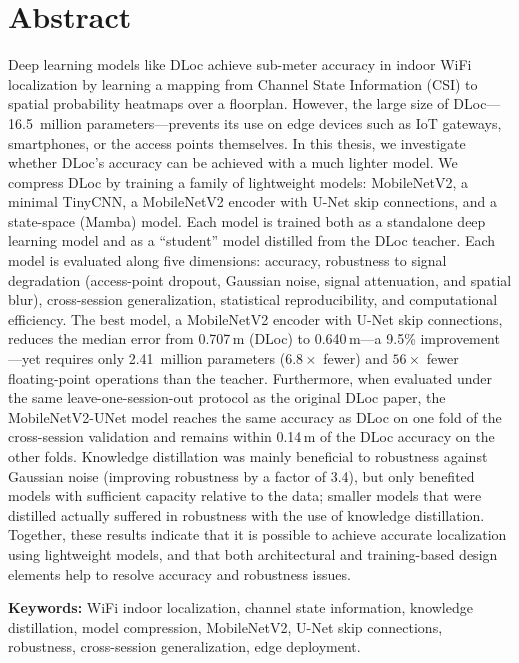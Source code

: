 \chapter*{Abstract}

Deep learning models like DLoc achieve sub-meter accuracy in indoor WiFi localization by learning a
mapping from Channel State Information (CSI) to spatial probability heatmaps over a floorplan. However,
the large size of DLoc---16.5~million parameters---prevents its use on edge devices such as IoT gateways,
smartphones, or the access points themselves. In this thesis, we investigate whether DLoc's accuracy can
be achieved with a much lighter model. We compress DLoc by training a family of lightweight models:
MobileNetV2, a minimal TinyCNN, a MobileNetV2 encoder with U-Net skip connections, and a state-space
(Mamba) model. Each model is trained both as a standalone deep learning model and as a ``student'' model
distilled from the DLoc teacher. Each model is evaluated along five dimensions: accuracy, robustness to
signal degradation (access-point dropout, Gaussian noise, signal attenuation, and spatial blur),
cross-session generalization, statistical reproducibility, and computational efficiency. The best model,
a MobileNetV2 encoder with U-Net skip connections, reduces the median error from 0.707\,m (DLoc) to
0.640\,m---a 9.5\% improvement---yet requires only 2.41~million parameters ($6.8\times$ fewer) and
$56\times$ fewer floating-point operations than the teacher. Furthermore, when evaluated under the same
leave-one-session-out protocol as the original DLoc paper, the MobileNetV2-UNet model reaches the same
accuracy as DLoc on one fold of the cross-session validation and remains within 0.14\,m of the DLoc
accuracy on the other folds. Knowledge distillation was mainly beneficial to robustness against Gaussian
noise (improving robustness by a factor of 3.4), but only benefited models with sufficient capacity
relative to the data; smaller models that were distilled actually suffered in robustness with the use of
knowledge distillation. Together, these results indicate that it is possible to achieve accurate
localization using lightweight models, and that both architectural and training-based design elements help
to resolve accuracy and robustness issues.

\vspace{0.8em}
\noindent\textbf{Keywords:} WiFi indoor localization, channel state information, knowledge distillation,
model compression, MobileNetV2, U-Net skip connections, robustness, cross-session generalization, edge
deployment.

\clearpage
